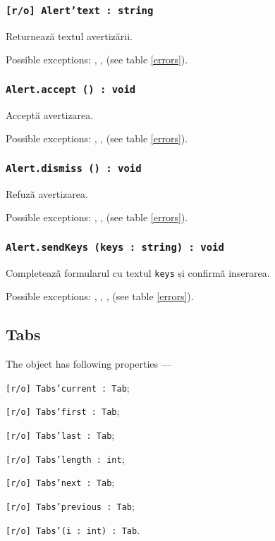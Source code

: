 \subsubsection{\texttt{[r/o] Alert'text : string}}

Returnează textul avertizării.

Possible exceptions: , ,  (see table \ref{errors}).

\subsubsection{\texttt{Alert.accept () : void}}

Acceptă avertizarea.

Possible exceptions: , ,  (see table \ref{errors}).

\subsubsection{\texttt{Alert.dismiss () : void}}

Refuză avertizarea.

Possible exceptions: , ,  (see table \ref{errors}).

\subsubsection{\texttt{Alert.sendKeys (keys : string) : void}}

Completează formularul cu textul \texttt{keys} și confirmă inserarea.

Possible exceptions: , , ,  (see table \ref{errors}).

\subsection{{\color{orange} Tabs}}

The object \tabs{} has following properties —
\begin{icItems}
	\item \texttt{[r/o] Tabs'current : Tab};
	\item \texttt{[r/o] Tabs'first : Tab};
	\item \texttt{[r/o] Tabs'last : Tab};
	\item \texttt{[r/o] Tabs'length : int};
	\item \texttt{[r/o] Tabs'next : Tab};
	\item \texttt{[r/o] Tabs'previous : Tab};
	\item \texttt{[r/o] Tabs'(i : int) : Tab}.
\end{icItems}

